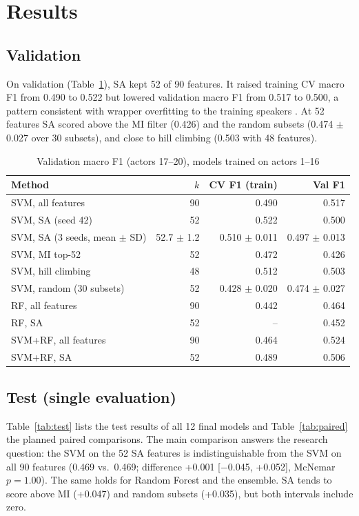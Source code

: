 \documentclass[conference]{IEEEtran}
\begin{document}
\section{Results}

\subsection{Validation}
On validation (Table~\ref{tab:val}), SA kept 52 of 90 features. It raised training CV macro F1
from 0.490 to 0.522 but lowered validation macro F1 from 0.517 to 0.500, a pattern consistent with
wrapper overfitting to the training speakers \cite{kohavi1997wrappers}. At 52 features SA scored
above the MI filter (0.426) and the random subsets (0.474 $\pm$ 0.027 over 30 subsets), and close
to hill climbing (0.503 with 48 features).

\begin{table}[t]
\caption{Validation macro F1 (actors 17--20), models trained on actors 1--16}
\label{tab:val}
\centering
\small
\setlength{\tabcolsep}{4pt}
\begin{tabular}{@{}lrrr@{}}
\toprule
Method & $k$ & CV F1 (train) & Val F1 \\
\midrule
SVM, all features & 90 & 0.490 & 0.517 \\
SVM, SA (seed 42) & 52 & 0.522 & 0.500 \\
SVM, SA (3 seeds, mean $\pm$ SD) & 52.7 $\pm$ 1.2 & 0.510 $\pm$ 0.011 & 0.497 $\pm$ 0.013 \\
SVM, MI top-52 & 52 & 0.472 & 0.426 \\
SVM, hill climbing & 48 & 0.512 & 0.503 \\
SVM, random (30 subsets) & 52 & 0.428 $\pm$ 0.020 & 0.474 $\pm$ 0.027 \\
RF, all features & 90 & 0.442 & 0.464 \\
RF, SA & 52 & -- & 0.452 \\
SVM+RF, all features & 90 & 0.464 & 0.524 \\
SVM+RF, SA & 52 & 0.489 & 0.506 \\
\bottomrule
\end{tabular}
\end{table}

\subsection{Test (single evaluation)}
Table~\ref{tab:test} lists the test results of all 12 final models and Table~\ref{tab:paired}
the planned paired comparisons. The main comparison answers the research question: the SVM on the
52 SA features is indistinguishable from the SVM on all 90 features (0.469 vs.\ 0.469; difference
+0.001 [$-$0.045, +0.052], McNemar $p=1.00$). The same holds for Random Forest and the ensemble.
SA tends to score above MI (+0.047) and random subsets (+0.035), but both intervals include zero.
\end{document}
